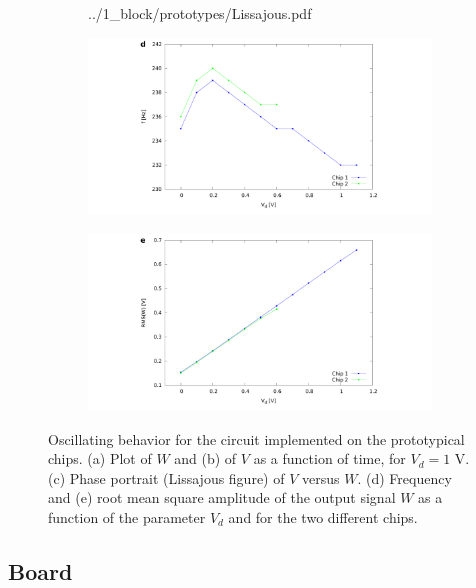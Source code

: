 \documentclass[a4paper,11pt,aps,secnumarabic,balancelastpage,amsmath,amssymb,floatfix,table]{article}
\begin{document}
\begin{figure}[H]
\begin{subfigure}{.39\textwidth}
        {../1_block/prototypes/Lissajous.pdf}
    \end{subfigure}
    \begin{subfigure}{.49\textwidth}
        \includegraphics[width=\linewidth,trim={10cm 0 9cm 0},clip,left]
        {../1_block/prototypes/freq_prot.pdf}
    \end{subfigure}
    \begin{subfigure}{.49\textwidth}
        \centering
        \includegraphics[width=\linewidth,trim={9cm 0 10cm 0},clip,right]
        {../1_block/prototypes/rms_prot.pdf}
    \end{subfigure}
    \caption{Oscillating behavior for the circuit implemented on
    the prototypical chips. (a) Plot of $W$ and (b) of $V$ as a
    function of time, for $V_d=1$ V.
    (c) Phase portrait (Lissajous figure) of $V$ versus $W$. (d)
    Frequency and (e) root mean square amplitude of the
    output signal $W$ as a function of the parameter $V_d$ and for
    the two different chips.}
    \label{fig:oscillation prototype}
\end{figure}

\subsection{Board}\label{sec:board}
\end{document}
